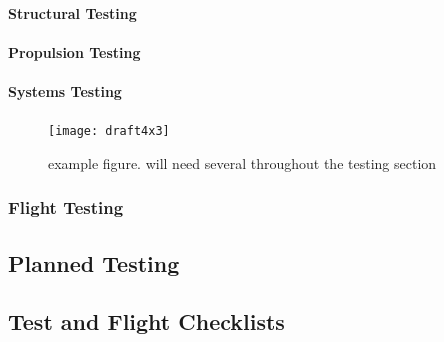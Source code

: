 \documentclass[report]{byu-aero}
\begin{document}
\paragraph{Structural Testing}

\paragraph{Propulsion Testing}

\paragraph{Systems Testing}


\lipsum[1-5]

\begin{figure}[h!]
	\centering
	\texttt{[image: draft4x3]}
	\caption{example figure. will need several throughout the testing section}
	\label{fig:}
\end{figure}

\lipsum[6-10]



\subsubsection{Flight Testing}
\label{sssec:flighttesting}

\lipsum[1-10]

\subsection{Planned Testing}
\label{ssec:plannedtesting}

\lipsum[1]

\subsection{Test and Flight Checklists}
\end{document}
